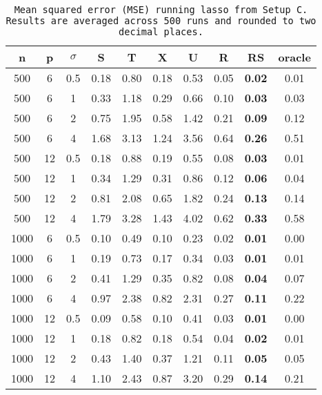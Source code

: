 \begin{table}[ht]
\centering
\begin{tabular}{cccccccccc}
  \hline
n & p & $\sigma$ & S & T & X & U & R & RS & oracle \\ 
  \hline
500 & 6 & 0.5 & 0.18 & 0.80 & 0.18 & 0.53 & 0.05 & \bf 0.02 & 0.01 \\ 
  500 & 6 & 1 & 0.33 & 1.18 & 0.29 & 0.66 & 0.10 & \bf 0.03 & 0.03 \\ 
  500 & 6 & 2 & 0.75 & 1.95 & 0.58 & 1.42 & 0.21 & \bf 0.09 & 0.12 \\ 
  500 & 6 & 4 & 1.68 & 3.13 & 1.24 & 3.56 & 0.64 & \bf 0.26 & 0.51 \\ 
  500 & 12 & 0.5 & 0.18 & 0.88 & 0.19 & 0.55 & 0.08 & \bf 0.03 & 0.01 \\ 
  500 & 12 & 1 & 0.34 & 1.29 & 0.31 & 0.86 & 0.12 & \bf 0.06 & 0.04 \\ 
  500 & 12 & 2 & 0.81 & 2.08 & 0.65 & 1.82 & 0.24 & \bf 0.13 & 0.14 \\ 
  500 & 12 & 4 & 1.79 & 3.28 & 1.43 & 4.02 & 0.62 & \bf 0.33 & 0.58 \\ 
  1000 & 6 & 0.5 & 0.10 & 0.49 & 0.10 & 0.23 & 0.02 & \bf 0.01 & 0.00 \\ 
  1000 & 6 & 1 & 0.19 & 0.73 & 0.17 & 0.34 & 0.03 & \bf 0.01 & 0.01 \\ 
  1000 & 6 & 2 & 0.41 & 1.29 & 0.35 & 0.82 & 0.08 & \bf 0.04 & 0.07 \\ 
  1000 & 6 & 4 & 0.97 & 2.38 & 0.82 & 2.31 & 0.27 & \bf 0.11 & 0.22 \\ 
  1000 & 12 & 0.5 & 0.09 & 0.58 & 0.10 & 0.41 & 0.03 & \bf 0.01 & 0.00 \\ 
  1000 & 12 & 1 & 0.18 & 0.82 & 0.18 & 0.54 & 0.04 & \bf 0.02 & 0.01 \\ 
  1000 & 12 & 2 & 0.43 & 1.40 & 0.37 & 1.21 & 0.11 & \bf 0.05 & 0.05 \\ 
  1000 & 12 & 4 & 1.10 & 2.43 & 0.87 & 3.20 & 0.29 & \bf 0.14 & 0.21 \\ 
   \hline
\end{tabular}
\caption{\tt Mean squared error (MSE) running \texttt{lasso} from Setup C. Results are averaged across 500 runs and rounded to two decimal places.} 
\label{table:setup3}
\end{table}
